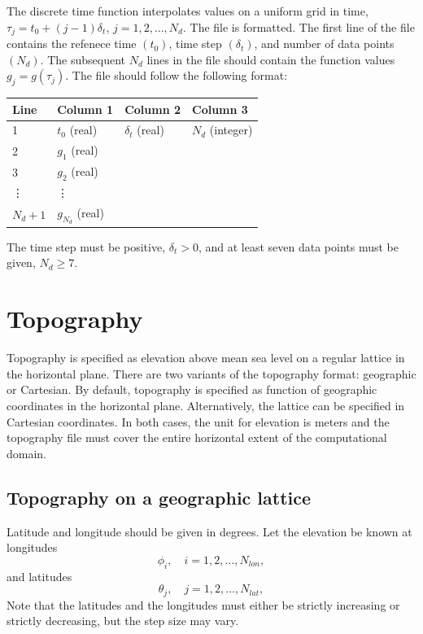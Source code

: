 \documentclass[11pt]{report}
\begin{document}
The discrete time function interpolates values on a uniform grid in time, $\tau_j = t_0 +
(j-1)\delta_t$, $j=1,2,\ldots,N_d$. The file is formatted. The first line of the file contains the
refenece time $(t_0)$, time step $(\delta_t)$, and number of data points $(N_d)$. The subsequent
$N_d$ lines in the file should contain the function values $g_j = g(\tau_j)$. The file should follow
the following format:
\begin{center}
\begin{tabular}{llll}\hline
Line & Column 1& Column 2& Column 3\\ \hline
1 & $t_0$ (real) & $\delta_t$ (real) & $N_d$ (integer) \\ \hline
2 & $g_1$ (real) & & \\ \hline
3 & $g_2$ (real) & & \\ \hline
\vdots & \vdots & & \\ \hline
$N_d + 1$ & $g_{N_d}$ (real) & & \\ \hline
\end{tabular}
\end{center}
The time step must be positive, $\delta_t>0$, and at least seven data points must be given, $N_d\geq
7$.

\section{Topography}\label{sec:topo-file-format}

Topography is specified as elevation above mean sea level on a regular lattice in the horizontal
plane. There are two variants of the topography format: geographic or Cartesian. By default,
topography is specified as function of geographic coordinates in the horizontal
plane. Alternatively, the lattice can be specified in Cartesian coordinates. In both cases, the unit
for elevation is meters and the topography file must cover the entire horizontal extent of the
computational domain.

\subsection{Topography on a geographic lattice}
Latitude and longitude should be given in degrees. Let the elevation be known at longitudes
\[
\phi_i,\quad i=1,2,\ldots,N_{lon},
\]
and latitudes
\[
\theta_j,\quad j=1,2,\ldots,N_{lat},
\]
Note that the latitudes and the longitudes must either be strictly increasing or strictly
decreasing, but the step size may vary.
\end{document}
